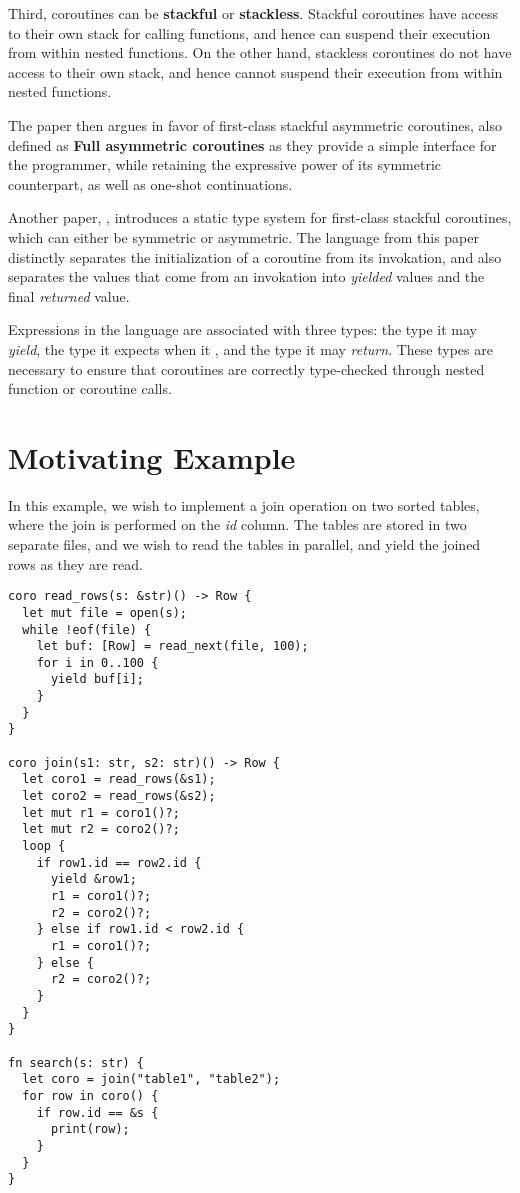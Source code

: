 \documentclass[review,twocolumn]{sigplanconf}
\begin{document}
Third, coroutines can be \textbf{stackful} or \textbf{stackless}. Stackful coroutines have access to their own stack for calling functions, and hence can suspend their execution from within nested functions. On the other hand, stackless coroutines do not have access to their own stack, and hence cannot suspend their execution from within nested functions.

The paper then argues in favor of first-class stackful asymmetric coroutines, also defined as \textbf{Full asymmetric coroutines} as they provide a simple interface for the programmer, while retaining the expressive power of its symmetric counterpart, as well as one-shot continuations.

Another paper, \citet{konrad2011}, introduces a static type system for first-class stackful coroutines, which can either be symmetric or asymmetric. The language from this paper distinctly separates the initialization of a coroutine from its invokation, and also separates the values that come from an invokation into \textit{yielded} values and the final \textit{returned} value.

Expressions in the language are associated with three types: the type it may \textit{yield}, the type it expects when it , and the type it may \textit{return}. These types are necessary to ensure that coroutines are correctly type-checked through nested function or coroutine calls.

\section{Motivating Example}



In this example, we wish to implement a join operation on two sorted tables, where the join is performed on the \textit{id} column. The tables are stored in two separate files, and we wish to read the tables in parallel, and yield the joined rows as they are read.

\begin{verbatim}
coro read_rows(s: &str)() -> Row {
  let mut file = open(s);
  while !eof(file) {
    let buf: [Row] = read_next(file, 100);
    for i in 0..100 {
      yield buf[i];
    }
  }
}

coro join(s1: str, s2: str)() -> Row {
  let coro1 = read_rows(&s1);
  let coro2 = read_rows(&s2);
  let mut r1 = coro1()?;
  let mut r2 = coro2()?;
  loop {
    if row1.id == row2.id {
      yield &row1;
      r1 = coro1()?;
      r2 = coro2()?;
    } else if row1.id < row2.id {
      r1 = coro1()?;
    } else {
      r2 = coro2()?;
    }
  }
}

fn search(s: str) {
  let coro = join("table1", "table2");
  for row in coro() {
    if row.id == &s {
      print(row);
    }
  }
}
\end{verbatim}
\end{document}
